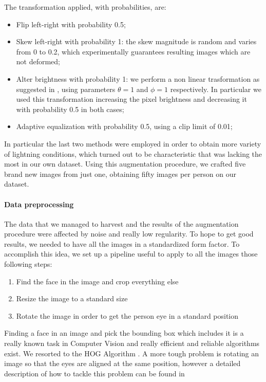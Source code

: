 The transformation applied, with probabilities, are:
\begin{itemize}
\item Flip left-right with probability 0.5;
\item Skew left-right with probability 1: the skew magnitude is random and varies from 0 to 0.2, which experimentally guarantees resulting images which are not deformed;
\item Alter brightness with probability 1: we perform a non linear trasformation as suggested in \cite{nonlintransf}, using parameters $\theta = 1$ and $\phi = 1$ respectively. In particular we used this transformation increasing the pixel brightness and decreasing it with probability 0.5 in both cases;
\item Adaptive equalization \cite{histeq} with probability 0.5, using a clip limit of 0.01;
\end{itemize}
In particular the last two methods were employed in order to obtain more variety of lightning conditions, which turned out to be characteristic that was lacking the most in our own dataset.
Using this augmentation procedure, we crafted five brand new images from just one, obtaining fifty images per person on our dataset.



\paragraph{Data preprocessing}
The data that we managed to harvest and the results of the augmentation procedure were affected by noise and really low regularity. To hope to get good results, we needed to have all the images in a standardized form factor. To accomplish this idea, we set up a pipeline useful to apply to all the images those following steps:

\begin{enumerate}
\item Find the face in the image and crop everything else
\item Resize the image to a standard size
\item Rotate the image in order to get the person eye in a standard position
\end{enumerate}

Finding a face in an image and pick the bounding box which includes it is a really known task in Computer Vision and really efficient and reliable algorithms exist. We resorted to the HOG Algorithm \cite{hog}. A more tough problem is rotating an image so that the eyes are aligned at the same position, however a detailed description of how to tackle this problem can be found in \cite{facealign}

